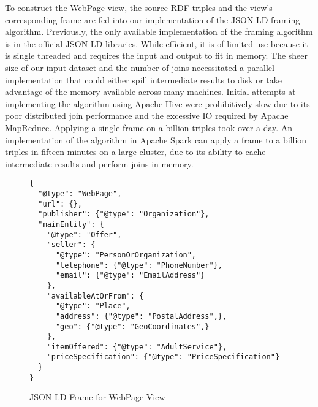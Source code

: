 To construct the WebPage view, the source RDF triples and the view's corresponding frame are fed into our implementation of the JSON-LD framing algorithm.  
Previously, the only available implementation of the framing algorithm is in the official JSON-LD libraries.  
While efficient, it is of limited use because it is single threaded and requires the input and output to fit in memory.
The sheer size of our input dataset and the number of joins necessitated a parallel implementation that could either spill intermediate results to disk or take advantage of the memory available across many machines. 
Initial attempts at implementing the algorithm using Apache Hive were prohibitively slow due to its poor distributed join performance and the excessive IO required by Apache MapReduce.  Applying a single frame on a billion triples took over a day.  
An implementation of the algorithm in Apache Spark can apply a frame to a billion triples in fifteen minutes on a large cluster, due to its ability to cache intermediate results and perform joins in memory.   
\begin{figure}
\vspace{-0.2cm}
\begin{verbatim}
{
  "@type": "WebPage",
  "url": {},
  "publisher": {"@type": "Organization"},
  "mainEntity": {
    "@type": "Offer",
    "seller": {
      "@type": "PersonOrOrganization",
      "telephone": {"@type": "PhoneNumber"},
      "email": {"@type": "EmailAddress"}
    },
    "availableAtOrFrom": {
      "@type": "Place",
      "address": {"@type": "PostalAddress",},
      "geo": {"@type": "GeoCoordinates",}
    },
    "itemOffered": {"@type": "AdultService"},
    "priceSpecification": {"@type": "PriceSpecification"}
  }
}
\end{verbatim}
\caption{JSON-LD Frame for WebPage View}
\label{fig:json_ld_webpage_view}
\vspace{-0.2cm}
\end{figure}
